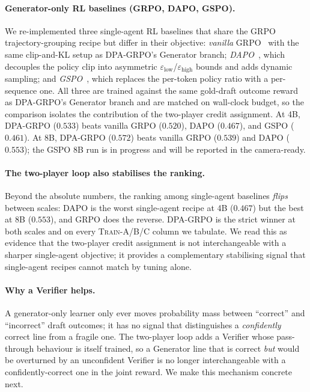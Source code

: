 \paragraph{Generator-only RL baselines (GRPO, DAPO, GSPO).}
We re-implemented three single-agent RL baselines that share the GRPO
trajectory-grouping recipe but differ in their objective: \emph{vanilla}
GRPO~\citep{shao2024deepseekmath} with the same clip-and-KL setup as
DPA-GRPO's Generator branch; \emph{DAPO}~\citep{yu2025dapo}, which
decouples the policy clip into asymmetric
$\varepsilon_{\text{low}}$/$\varepsilon_{\text{high}}$ bounds and adds
dynamic sampling; and \emph{GSPO}~\citep{zheng2025gspo}, which replaces
the per-token policy ratio with a per-sequence one. All three are
trained against the same gold-draft outcome reward as DPA-GRPO's
Generator branch and are matched on wall-clock budget, so the
comparison isolates the contribution of the two-player credit
assignment. At 4B, DPA-GRPO ($0.533$) beats vanilla GRPO ($0.520$),
DAPO ($0.467$), and GSPO ($0.461$). At 8B, DPA-GRPO ($0.572$) beats
vanilla GRPO ($0.539$) and DAPO ($0.553$); the GSPO 8B run is in
progress and will be reported in the camera-ready.

\paragraph{The two-player loop also stabilises the ranking.}
Beyond the absolute numbers, the ranking among single-agent baselines
\emph{flips} between scales: DAPO is the worst single-agent recipe at
4B ($0.467$) but the best at 8B ($0.553$), and GRPO does the
reverse. DPA-GRPO is the strict winner at both scales and on every
\textsc{Train-A/B/C} column we tabulate. We read this as evidence that
the two-player credit assignment is not interchangeable with a sharper
single-agent objective; it provides a complementary stabilising signal
that single-agent recipes cannot match by tuning alone.

\paragraph{Why a Verifier helps.}
A generator-only learner only ever moves probability mass between
``correct'' and ``incorrect'' draft outcomes; it has no signal that
distinguishes a \emph{confidently} correct line from a fragile one. The
two-player loop adds a Verifier whose pass-through behaviour is itself
trained, so a Generator line that is correct \emph{but} would be
overturned by an unconfident Verifier is no longer interchangeable with
a confidently-correct one in the joint reward. We make this mechanism
concrete next.

